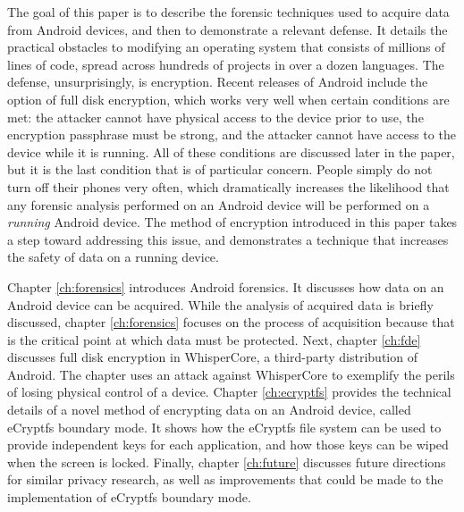 The goal of this paper is to describe the forensic techniques used to acquire data from Android devices, and
then to demonstrate a relevant defense. It details the practical obstacles to modifying an operating system that consists of
millions of lines of code, spread across hundreds of projects in over a dozen languages.  The defense, unsurprisingly, is
encryption. Recent releases of Android include the option of full disk encryption, which works very well when certain conditions are
met: the attacker cannot have physical access to the device prior to use, the encryption passphrase must be strong, and the attacker
cannot have access to the device while it is running.  All of these conditions are discussed later in the paper, but it
is the last condition that is of particular concern. People simply do not turn off their phones very often, which dramatically
increases the likelihood that any forensic analysis performed on an Android device will be performed on a \emph{running} Android
device. The method of encryption introduced in this paper takes a step toward addressing this issue, and demonstrates a technique
that increases the safety of data on a running device.

Chapter \ref{ch:forensics} introduces Android forensics. It discusses how data on an Android device can be acquired. While the
analysis of acquired data is briefly discussed, chapter \ref{ch:forensics} focuses on the process of acquisition because that is the
critical point at which data must be protected. Next, chapter \ref{ch:fde} discusses full disk encryption in WhisperCore, a
third-party distribution of Android. The chapter uses an attack against WhisperCore to exemplify the perils of losing physical
control of a device. Chapter \ref{ch:ecryptfs} provides the technical details of a novel method of encrypting data on an Android
device, called eCryptfs boundary mode. It shows how the eCryptfs file system can be used to provide independent keys for each
application, and how those keys can be wiped when the screen is locked.  Finally, chapter \ref{ch:future} discusses future
directions for similar privacy research, as well as improvements that could be made to the implementation of eCryptfs boundary mode.
